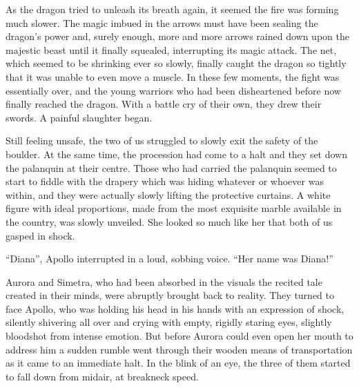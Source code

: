 As the dragon tried to unleash its breath again, it seemed the fire was forming much slower. The magic imbued in the arrows must have been sealing the dragon's power and, surely enough, more and more arrows rained down upon the majestic beast until it finally squealed, interrupting its magic attack. The net, which seemed to be shrinking ever so slowly, finally caught the dragon so tightly that it was unable to even move a muscle. In these few moments, the fight was essentially over, and the young warriors who had been disheartened before now finally reached the dragon. With a battle cry of their own, they drew their swords. A painful slaughter began.

Still feeling unsafe, the two of us struggled to slowly exit the safety of the boulder. At the same time, the procession had come to a halt and they set down the palanquin at their centre. Those who had carried the palanquin seemed to start to fiddle with the drapery which was hiding whatever or whoever was within, and they were actually slowly lifting the protective curtains. A white figure with ideal proportions, made from the most exquisite marble available in the country, was slowly unveiled. She looked so much like her that both of us gasped in shock.

\froufrou{}

\enquote{Diana}, Apollo interrupted in a loud, sobbing voice. \enquote{Her name was Diana!}

Aurora and Simetra, who had been absorbed in the visuals the recited tale created in their minds, were abruptly brought back to reality. They turned to face Apollo, who was holding his head in his hands with an expression of shock, silently shivering all over and crying with empty, rigidly staring eyes, slightly bloodshot from intense emotion. But before Aurora could even open her mouth to address him a sudden rumble went through their wooden means of transportation as it came to an immediate halt. In the blink of an eye, the three of them started to fall down from midair, at breakneck speed.
